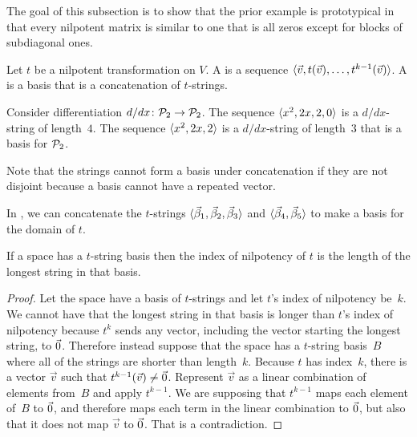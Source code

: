 The goal of this subsection is to show
that the prior example is prototypical
in that every nilpotent matrix is similar to one that is all
zeros except for blocks of subdiagonal ones.

\begin{definition}
Let \( t \) be a nilpotent transformation on \( V \).
A 
is a sequence
\( \langle\vec{v},t(\vec{v}),\ldots,t^{k-1}(\vec{v})\rangle \).
A 
is a basis that is a concatenation of \( t \)-strings.
\end{definition}

\begin{example}
Consider differentiation \( \mbox{$d/dx\colon \mathcal{P}_2\to \mathcal{P}_2$} \).
The sequence
\( \langle x^2, 2x, 2, 0\rangle \)
is a \( d/dx \)-string of length~\( 4 \).
The sequence
\( \langle x^2, 2x, 2\rangle \)
is a \( d/dx \)-string of length~\( 3 \)
that is a basis for \( \mathcal{P}_2\).
\end{example}

Note that the strings cannot form a basis under concatenation
if they are not disjoint because a basis cannot have a repeated vector. 

\begin{example}
In , we can concatenate the $t$-strings
$\langle\vec{\beta}_1,\vec{\beta}_2,\vec{\beta}_3\rangle$ and
$\langle\vec{\beta}_4,\vec{\beta}_5\rangle$
to make a basis for the domain of $t$.
\end{example}

\begin{lemma}  \label{le:LongestTowerIsIndex}
If a space has a \( t \)-string basis then the index of nilpotency of $t$
is the length of the longest string in that basis.
\end{lemma}

\begin{proof}
Let the space have a basis of $t$-strings and let $t$'s index of
nilpotency be~$k$.
We cannot have that the longest string in that basis is longer than
$t$'s index of nilpotency because
\( t^k \) sends any vector, including the vector starting the longest
string, to \( \vec{0} \).
Therefore instead suppose that the space has a $t$-string basis~$B$ where 
all of the strings are shorter than length~\( k \).
Because $t$ has index~$k$, there is a vector \( \vec{v} \) 
such that \( t^{k-1}(\vec{v})\neq\vec{0} \).
Represent $\vec{v}$ as a linear combination of elements from~$B$ 
and apply \( t^{k-1} \).
We are supposing that \( t^{k-1} \) maps each element of~$B$ to \( \vec{0} \),
and therefore maps each term in the linear combination to $\vec{0}$,
but also that it does not map \( \vec{v} \) to \( \vec{0} \).
That is a contradiction. 
\end{proof}

